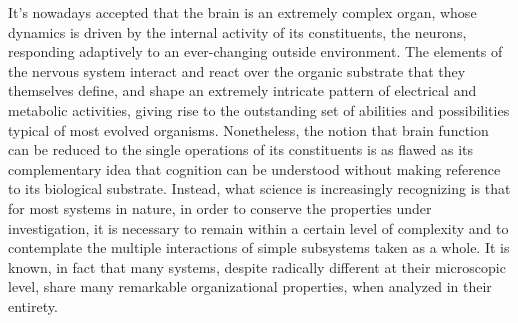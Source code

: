 
It's nowadays accepted that the brain is an extremely complex organ, whose dynamics is driven by the internal activity of its constituents, the neurons, responding adaptively to an ever-changing outside environment.
The elements of the nervous system interact and react over the organic substrate that they themselves define, and shape an extremely intricate pattern of electrical and metabolic activities, giving rise to the outstanding set of abilities and possibilities typical of most evolved organisms.
Nonetheless, the notion that brain function can be reduced to the single operations of its constituents is as flawed as its complementary idea that cognition can be understood without making reference to its biological substrate.
Instead, what science is increasingly recognizing is that for most systems in nature, in order to conserve the properties under investigation, it is necessary to remain within a certain level of complexity and to contemplate the multiple interactions of simple subsystems taken as a whole. It is known, in fact that many systems, despite radically different at their microscopic level, share many remarkable organizational properties, when analyzed in their entirety.

